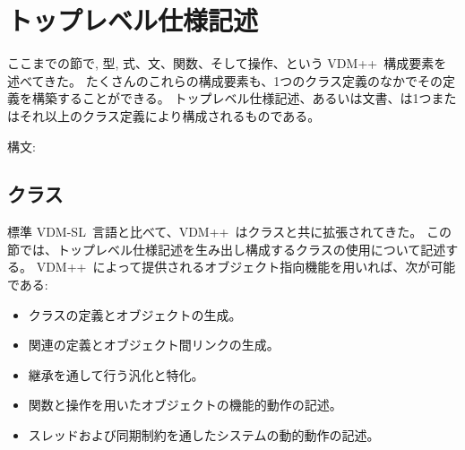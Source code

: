 \documentclass[\pformat,12pt]{jarticle}
\newcommand{\vdmsl}{VDM-SL}
\newcommand{\vdmpp}{VDM++}
\begin{document}
%
%


%

\newpage
\section{トップレベル仕様記述}

ここまでの節で, 型, 式、文、関数、そして操作、という \vdmpp\ 構成要素を述べてきた。
たくさんのこれらの構成要素も、1つのクラス定義のなかでその定義を構築することができる。
トップレベル仕様記述、あるいは文書、は1つまたはそれ以上のクラス定義により構成されるものである。

\begin{description}
\item[構文:]
\end{description}


\subsection{クラス}
\label{sec:classdep}

標準 \vdmsl\ 言語と比べて、\vdmpp\ はクラスと共に拡張されてきた。
この節では、トップレベル仕様記述を生み出し構成するクラスの使用について記述する。
 \vdmpp\ によって提供されるオブジェクト指向機能を用いれば、次が可能である:

\begin{itemize}
\item クラスの定義とオブジェクトの生成。
\item 関連の定義とオブジェクト間リンクの生成。
\item 継承を通して行う汎化と特化。
\item 関数と操作を用いたオブジェクトの機能的動作の記述。
\item スレッドおよび同期制約を通したシステムの動的動作の記述。
\end{itemize}
\end{document}
